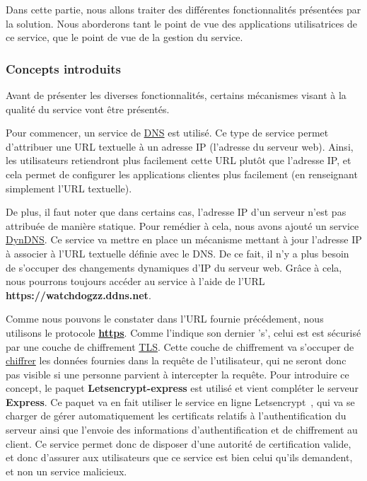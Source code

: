 Dans cette partie, nous allons traiter des différentes fonctionnalités présentées par la solution. Nous aborderons tant le point de vue des applications utilisatrices de ce service, que le point de vue de la gestion du service.

\subsubsection{Concepts introduits}

Avant de présenter les diverses fonctionnalités, certains mécanismes visant à la qualité du service vont être présentés.

Pour commencer, un service de \underline{DNS} est utilisé. Ce type de service permet d'attribuer une URL textuelle à un adresse IP (l'adresse du serveur web). Ainsi, les utilisateurs retiendront plus facilement cette URL plutôt que l'adresse IP, et cela permet de configurer les applications clientes plus facilement (en renseignant simplement l'URL textuelle).

De plus, il faut noter que dans certains cas, l'adresse IP d'un serveur n'est pas attribuée de manière statique. Pour remédier à cela, nous avons ajouté un service \underline{DynDNS}. Ce service va mettre en place un mécanisme mettant à jour l'adresse IP à associer à l'URL textuelle définie avec le DNS. De ce fait, il n'y a plus besoin de s'occuper des changements dynamiques d'IP du serveur web. Grâce à cela, nous pourrons toujours accéder au service à l'aide de l'URL \textbf{https://watchdogzz.ddns.net}.

Comme nous pouvons le constater dans l'URL fournie précédement, nous utilisons le protocole \textbf{\underline{https}}. Comme l'indique son dernier 's', celui est est sécurisé par une couche de chiffrement \underline{TLS}. Cette couche de chiffrement va s'occuper de \underline{chiffrer} les données fournies dans la requête de l'utilisateur, qui ne seront donc pas visible si une personne parvient à intercepter la requête.
Pour introduire ce concept, le paquet \textbf{Letsencrypt-express} est utilisé et vient compléter le serveur \textbf{Express}. Ce paquet va en fait utiliser le service en ligne Letsencrypt~\cite{letsencrypt}, qui va se charger de gérer automatiquement les certificats relatifs à l'authentification du serveur ainsi que l'envoie des informations d'authentification et de chiffrement au client. Ce service permet donc de disposer d'une autorité de certification valide, et donc d'assurer aux utilisateurs que ce service est bien celui qu'ils demandent, et non un service malicieux.

